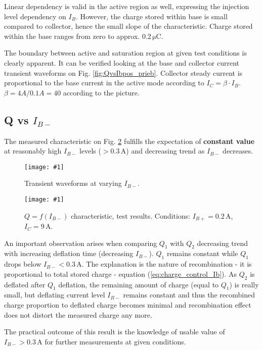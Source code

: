 \documentclass[conference]{IEEEtran}
\newcommand{\un}[1]{\, \mathrm{#1}}	%
\newcommand{\myfigsc}[3]
{
    \begin{figure}[!ht]
	\centering
	\texttt{[image: \#1]}
	\caption{#2}
	#3
    \end{figure}
}
\begin{document}
Linear dependency is valid in the active region as well, expressing the injection level dependency on $I_B$. However, the charge stored within base is small compared to collector, hence the small slope of the characteristic.
Charge stored within the base ranges from zero to approx. $0.2\un{\mu C}$.

The boundary between active and saturation region at given test conditions is clearly apparent. It can be verified looking at the base and collector current transient waveforms on Fig. \ref{fig:QvsIbpos_prieb}. Collector steady current is proportional to the base current in the active mode according to $I_C = \beta \cdot I_B$. $\beta = 4A / 0.1A = 40$ according to the picture.


\subsection{Q vs $I_{B-}$}

The measured characteristic on Fig. \ref{fig:QvsIbneg} fulfills the expectation of \textbf{constant value} at reasonably high $I_{B-}$ levels ($> 0.3 \un{A}$) and decreasing trend as $I_{B-}$ decreases.

\myfigsc{QvsIbneg_prieb}{Transient waveforms at varying $I_{B-}$.}{\label{fig:QvsIbneg_prieb}}
\myfigsc{QvsIbneg}{$Q=f(I_{B-})$ characteristic, test results. Conditions: $I_{B+}=0.2\un{A}$, $I_C=9\un{A}$.}{\label{fig:QvsIbneg}}

An important observation arises when comparing $Q_1$ with $Q_2$ decreasing trend with increasing deflation time (decreasing $I_{B-}$). $Q_1$ remains constant while $Q_1$ drops below $I_{B-}<0.3\un{A}$. The explanation is the nature of recombination - it is proportional to total stored charge - equation (\ref{eq:charge_control_Ib}). As $Q_2$ is deflated after $Q_1$ deflation, the remaining amount of charge (equal to $Q_1$) is really small, but deflating current level $I_{B-}$ remains constant and thus the recombined charge proportion to deflated charge becomes minimal and recombination effect does not distort the measured charge any more.

The practical outcome of this result is the knowledge of usable value of $I_{B-} > 0.3 \un{A}$ for further measurements at given conditions.
\end{document}
